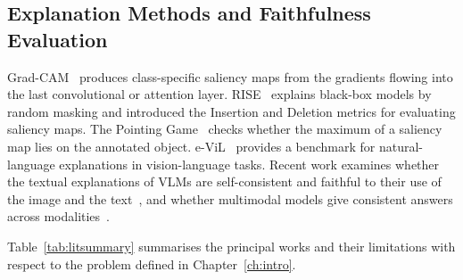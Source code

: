 \subsection{Explanation Methods and Faithfulness Evaluation}
Grad-CAM~\cite{selvaraju2017gradcam} produces class-specific saliency maps from the gradients flowing into the last convolutional or attention layer. RISE~\cite{petsiuk2018rise} explains black-box models by random masking and introduced the Insertion and Deletion metrics for evaluating saliency maps. The Pointing Game~\cite{zhang2018excitation} checks whether the maximum of a saliency map lies on the annotated object. e-ViL~\cite{kayser2021evil} provides a benchmark for natural-language explanations in vision-language tasks. Recent work examines whether the textual explanations of VLMs are self-consistent and faithful to their use of the image and the text~\cite{parcalabescu2025faithfulness}, and whether multimodal models give consistent answers across modalities~\cite{zhang2024crossmodal}.

Table~\ref{tab:litsummary} summarises the principal works and their limitations with respect to the problem defined in Chapter~\ref{ch:intro}.

